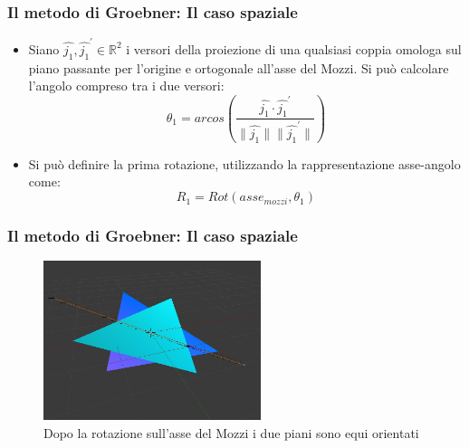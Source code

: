 \documentclass{beamer}
\begin{document}
\begin{frame}
\frametitle{Il metodo di Groebner: Il caso spaziale}
\begin{itemize}
	\item Siano $\hat{j_1}, \hat{j_1}^{'} \in \mathbb{R}^2$ i versori della proiezione di una qualsiasi coppia omologa sul piano passante per l'origine e ortogonale all'asse del Mozzi. Si può calcolare l'angolo compreso tra i due versori:
	\begin{equation}
	\theta_1 = arcos(\frac{\hat{j_1} \cdot \hat{j_1}^{'}}{\| \hat{j_1}\| \|\hat{j_1}^{'}\|})
	\end{equation}
	\item Si può definire la prima rotazione, utilizzando la rappresentazione asse-angolo come:
	\begin{equation}
	R_1 = Rot(asse_{mozzi}, \theta_1)
	\end{equation} 
\end{itemize}
\end{frame}

\begin{frame}
\frametitle{Il metodo di Groebner: Il caso spaziale}

\begin{figure}[h]
	\centering
	\includegraphics[width=180pt]{imgs/PianiSuStessoPiano.jpg}
	\caption{Dopo la rotazione sull'asse del Mozzi i due piani sono equi orientati}
	\label{rot:gb:samePlane}
\end{figure} 
\end{frame}
\end{document}
